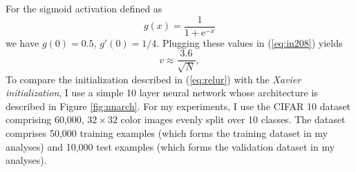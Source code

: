 \documentclass[a4paper]{article}
\newcommand{\enum}[1]{\label{eq:#1}}
\newcommand{\eref}[1]{(\ref {eq:#1})}
\newcommand{\be}{\begin{equation}}
\newcommand{\ee}{\end{equation}}
\begin{document}
For the sigmoid activation defined as
\be 
g(x) = \frac{1}{1 + \mbox{e}^{-x}}
\ee
we have $g(0) = 0.5$, $g'(0) = 1/4$. Plugging these values in \eref{in208} yields
\be 
v \approx \frac{3.6}{\sqrt{N}}, \enum{relur}
\ee 
To compare the initialization described in \eref{relur} with
the {\it{Xavier initialization}}, I use a simple 10 layer neural network whose architecture is described in Figure \ref{fig:nnarch}. For my experiments, I use the  CIFAR 10 dataset \cite{krizhevsky2009learning} comprising 60,000,  $32 \times 32$ color images evenly split over 10 classes. The dataset comprises 50,000 training examples (which forms the training dataset in my analyses) and 10,000 test examples (which forms the validation dataset in my analyses). 
\end{document}
